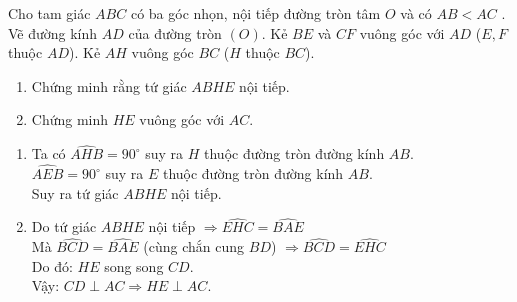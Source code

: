\begin{ex}%
    Cho tam giác $ABC$ có ba góc nhọn, nội tiếp  đường tròn tâm $O$ và có $AB<AC$ . Vẽ đường kính $AD$ của đường tròn $(O)$. Kẻ $BE$ và $CF$ vuông góc với $AD$ ($E, F$ thuộc $AD$). Kẻ $AH$ vuông góc $BC$ ($H$ thuộc $BC$).
     \begin{enumerate}
        \item Chứng minh rằng tứ giác $ABHE$ nội tiếp.
        \item Chứng minh $HE$ vuông góc với $AC$.
    \end{enumerate}
\loigiai
  {
\begin{center}
\end{center}
  \begin{enumerate}
        \item Ta có $\widehat{AHB}=90^\circ$ suy ra $H$ thuộc  đường tròn đường kính $AB$.\\
                    $\widehat{AEB}=90^\circ$ suy ra $E$ thuộc  đường tròn đường kính $AB$.\\
                    Suy ra tứ giác $ABHE$ nội tiếp.
        \item Do tứ giác $ABHE$ nội tiếp $\Rightarrow \widehat{EHC}=\widehat{BAE}$ \\
            Mà $\widehat{BCD}=\widehat{BAE}$ (cùng chắn cung $BD$) $\Rightarrow \widehat{BCD}=\widehat{EHC}$\\
            Do đó: $HE$ song song $CD$.\\
            Vậy: $CD\perp AC\Rightarrow HE\perp AC$.
  \end{enumerate}
    }
\end{ex}
